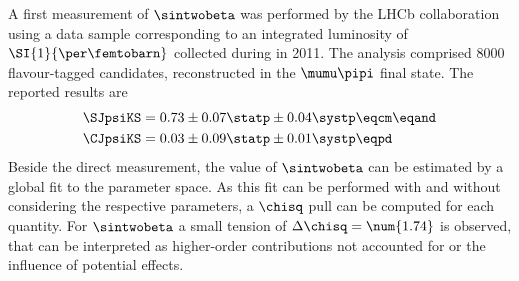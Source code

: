 %
A first measurement of $\sintwobeta$ was performed by the \acs*{LHCb}
collaboration using a data sample corresponding to an integrated luminosity of
$\SI{1}{\per\femtobarn}$ collected during \RunOne in 2011. The analysis
comprised $\num{8000}$ flavour-tagged \BdToJpsiKS candidates, reconstructed in
the $\mumu\pipi$ final state. The reported results \cite{Aaij:1497268} are
%
\begin{equation*}
  \begin{split}
    \SJpsiKS &= 0.73 \pm 0.07 \statp \pm 0.04 \systp \eqcm\eqand \\
    \CJpsiKS &= 0.03 \pm 0.09 \statp \pm 0.01 \systp \eqpd
  \end{split}
\end{equation*}
%
Beside the direct measurement, the value of $\sintwobeta$ can be estimated by a
global fit to the \CKM parameter space. As this fit can be performed with and
without considering the respective parameters, a $\chisq$ pull can be computed
for each quantity. For $\sintwobeta$ a small tension of $\Delta\chisq =
\num{1.74}$ is observed, that can be interpreted as higher-order contributions
not accounted for or the influence of potential \BSM effects.
